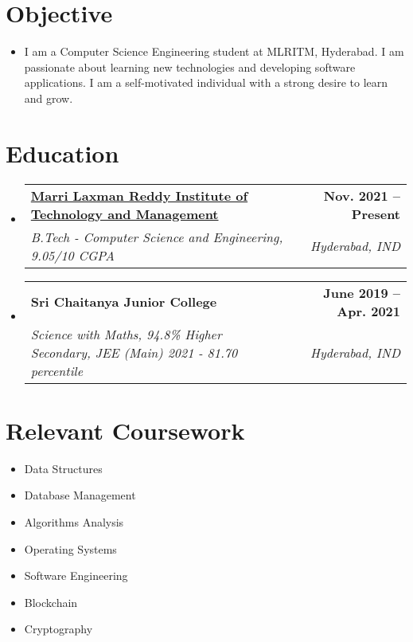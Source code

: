 \documentclass[a4paper,11pt]{article}
\makeatletter
\newcommand{\resumeSubheading}[4]{
  \vspace{-2pt}\item
    \begin{tabular*}{0.97\textwidth}[t]{l@{\extracolsep{\fill}}r}
      \textbf{#1} & \textbf{\small #2} \\
      \textit{\small#3} & \textit{\small #4} \\
    \end{tabular*}\vspace{-7pt}
}
\newcommand{\resumeSubHeadingListStart}{\begin{itemize}[leftmargin=0.15in, label={}]}
\newcommand{\resumeSubHeadingListEnd}{\end{itemize}}
\makeatother
\begin{document}
\section{Objective}
  \begin{itemize}[leftmargin=0.15in, label={}]
    \item \fontsize{10}{12} \selectfont
    I am a Computer Science Engineering student at MLRITM, Hyderabad. I am passionate about learning new technologies and developing software applications. I am a self-motivated individual with a strong desire to learn and grow.
  \end{itemize}

\vspace{-15pt}
\section{Education}
  \resumeSubHeadingListStart
    \resumeSubheading
      {\href{https://mlritm.ac.in}{Marri Laxman Reddy Institute of Technology and Management}}{Nov. 2021 -- Present}
      {B.Tech - Computer Science and Engineering, 9.05/10 CGPA}{Hyderabad, IND}
    \resumeSubheading
      {Sri Chaitanya Junior College}{June 2019 -- Apr. 2021}
      {Science with Maths, 94.8\% Higher Secondary, JEE (Main) 2021 - 81.70 percentile}{Hyderabad, IND}
  \resumeSubHeadingListEnd

\section{Relevant Coursework}
        \begin{multicols}{4}
            \begin{itemize}[itemsep=-3pt, parsep=3pt]
              \small
                \item Data Structures
                \item Database Management
                \item Algorithms Analysis
                \item Operating Systems
                \item Software Engineering
                \item Blockchain
                \item Cryptography
            \end{itemize}
        \end{multicols}
        \vspace*{2.0\multicolsep}
\end{document}
